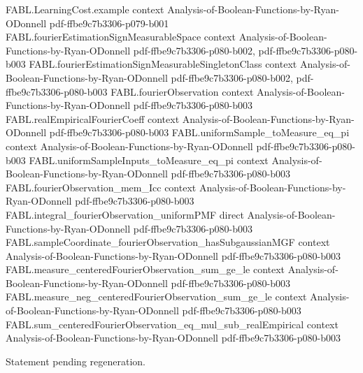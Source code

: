 \begin{theorem}
  {FABL.LearningCost.example}
  {context}
  {Analysis-of-Boolean-Functions-by-Ryan-ODonnell}
  {pdf-ffbe9c7b3306-p079-b001}
\proofstep
  {FABL.fourierEstimationSignMeasurableSpace}
  {context}
  {Analysis-of-Boolean-Functions-by-Ryan-ODonnell}
  {pdf-ffbe9c7b3306-p080-b002,
    pdf-ffbe9c7b3306-p080-b003}
\proofstep
  {FABL.fourierEstimationSignMeasurableSingletonClass}
  {context}
  {Analysis-of-Boolean-Functions-by-Ryan-ODonnell}
  {pdf-ffbe9c7b3306-p080-b002,
    pdf-ffbe9c7b3306-p080-b003}
\proofstep
  {FABL.fourierObservation}
  {context}
  {Analysis-of-Boolean-Functions-by-Ryan-ODonnell}
  {pdf-ffbe9c7b3306-p080-b003}
\proofstep
  {FABL.realEmpiricalFourierCoeff}
  {context}
  {Analysis-of-Boolean-Functions-by-Ryan-ODonnell}
  {pdf-ffbe9c7b3306-p080-b003}
\proofstep
  {FABL.uniformSample_toMeasure_eq_pi}
  {context}
  {Analysis-of-Boolean-Functions-by-Ryan-ODonnell}
  {pdf-ffbe9c7b3306-p080-b003}
\proofstep
  {FABL.uniformSampleInputs_toMeasure_eq_pi}
  {context}
  {Analysis-of-Boolean-Functions-by-Ryan-ODonnell}
  {pdf-ffbe9c7b3306-p080-b003}
\proofstep
  {FABL.fourierObservation_mem_Icc}
  {context}
  {Analysis-of-Boolean-Functions-by-Ryan-ODonnell}
  {pdf-ffbe9c7b3306-p080-b003}
\proofstep
  {FABL.integral_fourierObservation_uniformPMF}
  {direct}
  {Analysis-of-Boolean-Functions-by-Ryan-ODonnell}
  {pdf-ffbe9c7b3306-p080-b003}
\proofstep
  {FABL.sampleCoordinate_fourierObservation_hasSubgaussianMGF}
  {context}
  {Analysis-of-Boolean-Functions-by-Ryan-ODonnell}
  {pdf-ffbe9c7b3306-p080-b003}
\proofstep
  {FABL.measure_centeredFourierObservation_sum_ge_le}
  {context}
  {Analysis-of-Boolean-Functions-by-Ryan-ODonnell}
  {pdf-ffbe9c7b3306-p080-b003}
\proofstep
  {FABL.measure_neg_centeredFourierObservation_sum_ge_le}
  {context}
  {Analysis-of-Boolean-Functions-by-Ryan-ODonnell}
  {pdf-ffbe9c7b3306-p080-b003}
\proofstep
  {FABL.sum_centeredFourierObservation_eq_mul_sub_realEmpirical}
  {context}
  {Analysis-of-Boolean-Functions-by-Ryan-ODonnell}
  {pdf-ffbe9c7b3306-p080-b003}

Statement pending regeneration.
\end{theorem}

